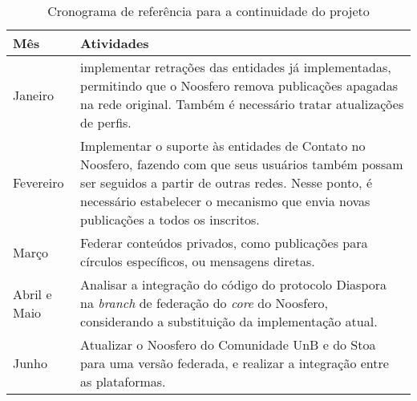 \begin{table}[h]
  \begin{center}
    \begin{tabular}{| l | p{12cm} |}
    \hline
    \textbf{Mês} & \textbf{Atividades} \\
    \hline
    Janeiro & implementar retrações das entidades já implementadas, permitindo que
    o Noosfero remova publicações apagadas na rede original. Também é necessário
    tratar atualizações de perfis. \\
    \hline
    Fevereiro & Implementar o suporte às entidades de Contato no Noosfero, fazendo
    com que seus usuários também possam ser seguidos a partir de outras redes. Nesse
    ponto, é necessário estabelecer o mecanismo que envia novas publicações a todos
    os inscritos. \\
    \hline
    Março & Federar conteúdos privados, como publicações para círculos específicos,
    ou mensagens diretas. \\
    \hline
    Abril e Maio & Analisar a integração do código do protocolo Diaspora na
    \textit{branch} de federação do \textit{core} do Noosfero, considerando a
    substituição da implementação atual. \\
    \hline
    Junho & Atualizar o Noosfero do Comunidade UnB e do Stoa para uma versão
    federada, e realizar a integração entre as plataformas. \\
    \hline
    \end{tabular}
  \end{center}
  \caption{Cronograma de referência para a continuidade do projeto}
  \label{tab:cronograma}
\end{table}
